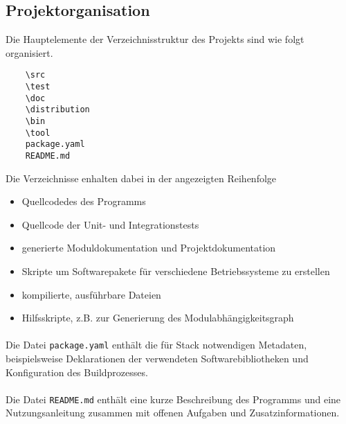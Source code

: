 \subsection{Projektorganisation}
Die Hauptelemente der Verzeichnisstruktur des Projekts sind wie folgt organisiert.

\begin{verbatim}
    \src
    \test
    \doc
    \distribution
    \bin
    \tool
    package.yaml
    README.md
\end{verbatim}

Die Verzeichnisse enhalten dabei in der angezeigten Reihenfolge

\begin{itemize}
    \item Quellcodedes des Programms
    \item Quellcode der Unit- und Integrationstests
    \item generierte Moduldokumentation und Projektdokumentation
    \item Skripte um Softwarepakete für verschiedene Betriebssysteme zu erstellen
    \item kompilierte, ausführbare Dateien
    \item Hilfsskripte, z.B. zur Generierung des Modulabhängigkeitsgraph
\end{itemize}

\paragraph{}
Die Datei \texttt{package.yaml} enthält die für Stack notwendigen Metadaten,
beispielsweise Deklarationen der verwendeten Softwarebibliotheken und Konfiguration
des Buildprozesses.

\paragraph{}
Die Datei \texttt{README.md} enthält eine kurze Beschreibung des
Programms und eine Nutzungsanleitung zusammen mit offenen Aufgaben und
Zusatzinformationen.